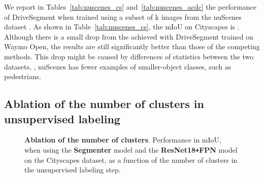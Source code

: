 \documentclass[runningheads]{llncs}
\newcommand{\ours}{DriveSegment\xspace}
\def\Plus{\texttt{+}}
\begin{document}
\endgroup 
We report in Tables~\ref{tab:nuscenes_cs} and~\ref{tab:nuscenes_acdc} the performance of \ours when trained 
using a subset of k images from the nuScenes dataset \cite{nuscenes}. 
As shown in Table~\ref{tab:nuscenes_cs}, 
the mIoU on Cityscapes is .
Although there is a small drop from the  achieved with \ours trained on Waymo Open, the results are still significantly better than those of the competing methods.
This drop might be caused by differences of statistics between the two datasets, \eg, nuScenes has fewer examples of smaller-object classes, such as pedestrians.



\subsection{Ablation of the number of clusters in unsupervised labeling}
\label{sec:clusters_number_ablation}


\begin{figure}[t]
        \centering



     \caption{        
    \textbf{Ablation of the number of clusters}. Performance in mIoU, when using the
        {\textcolor{RoyalPurple}{\textbf{Segmenter}}} model and the {\textcolor{BrickRed}{\textbf{ResNet18\Plus FPN}}} model on the Cityscapes dataset,  
        as a function of the number of clusters in the unsupervised labeling step.  
        }
    \label{fig:num_clusters_comparison}
\end{figure}
\end{document}
